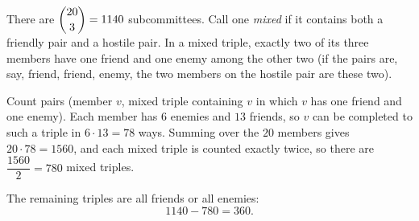 There are $\dbinom{20}{3}=1140$ subcommittees. Call one \emph{mixed} if it contains both a friendly pair and a hostile pair. In a mixed triple, exactly two of its three members have one friend and one enemy among the other two (if the pairs are, say, friend, friend, enemy, the two members on the hostile pair are these two).

Count pairs (member $v$, mixed triple containing $v$ in which $v$ has one friend and one enemy). Each member has $6$ enemies and $13$ friends, so $v$ can be completed to such a triple in $6\cdot13=78$ ways. Summing over the $20$ members gives $20\cdot78=1560$, and each mixed triple is counted exactly twice, so there are $\dfrac{1560}{2}=780$ mixed triples.

The remaining triples are all friends or all enemies:
\[
1140-780=\boxed{360}.
\]
